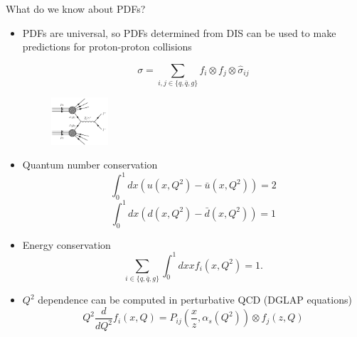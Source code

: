 \documentclass[8pt,t]{beamer}
\begin{document}
\begin{frame}{What do we know about PDFs?}

    \begin{itemize}
      \item PDFs are universal, so PDFs determined from DIS can be used to make predictions for proton-proton collisions

        \begin{equation*}
          \sigma=\sum_{i, j \in \{q,\bar{q},g\}} f_i \otimes f_j \otimes \hat{\sigma}_{i j}
        \end{equation*}

        \begin{figure}
          \includegraphics[width=0.2\textwidth]{dy_schematic.png}
        \end{figure}

      \item Quantum number conservation
        \begin{equation*}
          \int_0^1 d x\left(u\left(x, Q^2\right)-\bar{u}\left(x, Q^2\right)\right)=2
        \end{equation*}
        \begin{equation*}
          \int_0^1 d x\left(d\left(x, Q^2\right)-\bar{d}\left(x, Q^2\right)\right)=1
        \end{equation*}

        \item Energy conservation
          \begin{equation*}
            \sum_{i\in \{q, \bar{q}, g\}} \int_0^1 d x x f_i\left(x, Q^2\right)=1 .
          \end{equation*}

      \item $Q^2$ dependence can be computed in perturbative QCD (DGLAP equations)
        \begin{equation*}
          Q^2 \frac{d}{d Q^2} f_i(x, Q)=P_{i j}\left(\frac{x}{z}, \alpha_s(Q^2)\right) \otimes f_j(z, Q)
        \end{equation*}

    \end{itemize}


\end{frame}
\end{document}
